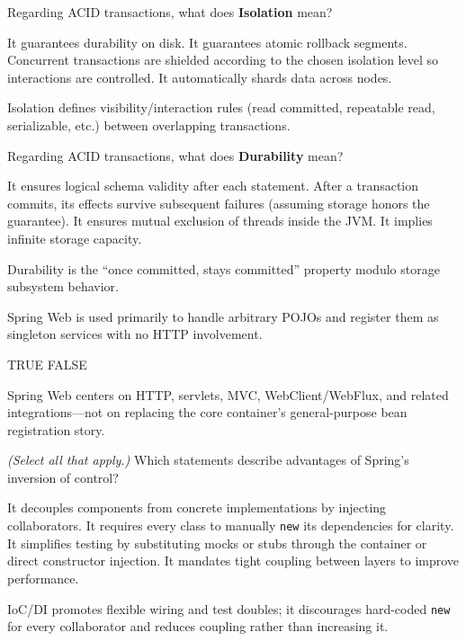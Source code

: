 \question[4]
Regarding ACID transactions, what does \textbf{Isolation} mean?
\begin{choices}
  \choice It guarantees durability on disk.
  \choice It guarantees atomic rollback segments.
  \CorrectChoice Concurrent transactions are shielded according to the chosen isolation level so interactions are controlled.
  \choice It automatically shards data across nodes.
\end{choices}
\begin{solution}
  Isolation defines visibility/interaction rules (read committed, repeatable read, serializable, etc.) between overlapping transactions.
\end{solution}

\question[4]
Regarding ACID transactions, what does \textbf{Durability} mean?
\begin{choices}
  \choice It ensures logical schema validity after each statement.
  \CorrectChoice After a transaction commits, its effects survive subsequent failures (assuming storage honors the guarantee).
  \choice It ensures mutual exclusion of threads inside the JVM.
  \choice It implies infinite storage capacity.
\end{choices}
\begin{solution}
  Durability is the ``once committed, stays committed'' property modulo storage subsystem behavior.
\end{solution}

\question[4]
Spring Web is used primarily to handle arbitrary POJOs and register them as singleton services with no HTTP involvement.
\begin{choices}
  \choice TRUE
  \CorrectChoice FALSE
\end{choices}
\begin{solution}
  Spring Web centers on HTTP, servlets, MVC, WebClient/WebFlux, and related integrations---not on replacing the core container's general-purpose bean registration story.
\end{solution}

\question[4]
\textit{(Select all that apply.)} Which statements describe advantages of Spring's inversion of control?
\begin{checkboxes}
  \CorrectChoice It decouples components from concrete implementations by injecting collaborators.
  \choice It requires every class to manually \texttt{new} its dependencies for clarity.
  \CorrectChoice It simplifies testing by substituting mocks or stubs through the container or direct constructor injection.
  \choice It mandates tight coupling between layers to improve performance.
\end{checkboxes}
\begin{solution}
  IoC/DI promotes flexible wiring and test doubles; it discourages hard-coded \texttt{new} for every collaborator and reduces coupling rather than increasing it.
\end{solution}

